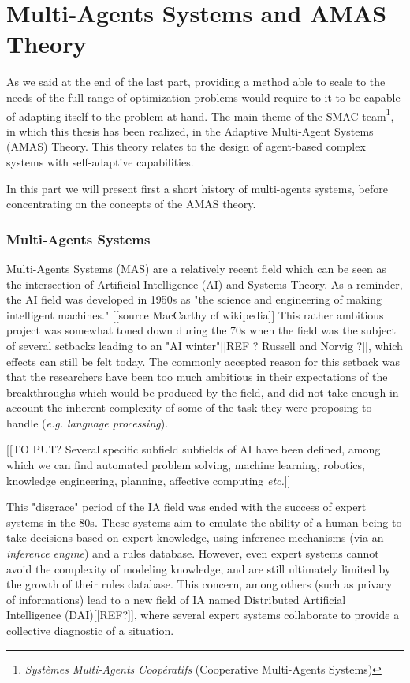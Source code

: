 \part{Multi-Agents Systems and AMAS Theory}

As we said at the end of the last part, providing a method able to scale to the needs of the full range of optimization problems would require to it to be capable of adapting itself to the problem at hand.
The main theme of the SMAC team\footnote{\emph{Systèmes Multi-Agents Coopératifs} (Cooperative Multi-Agents Systems)}, in which this thesis has been realized, in the Adaptive Multi-Agent Systems (AMAS) Theory. This theory relates to the design of agent-based complex systems with self-adaptive capabilities.

In this part we will present first a short history of multi-agents systems, before concentrating on the concepts of the AMAS theory.

\section{Multi-Agents Systems}

Multi-Agents Systems (MAS) are a relatively recent field which can be seen as the intersection of Artificial Intelligence (AI) and Systems Theory. As a reminder, the AI field was developed in 1950s as "the science and engineering of making intelligent machines." [[source MacCarthy cf wikipedia]] This rather ambitious project was somewhat toned down during the 70s when the field was the subject of several setbacks leading to an "AI winter"[[REF ? Russell and Norvig ?]], which effects can still be felt today. The commonly accepted reason for this setback was that the researchers have been too much ambitious in their expectations of the breakthroughs which would be produced by the field, and did not take enough in account the inherent complexity of some of the task they were proposing to handle (\emph{e.g. language processing}).

[[TO PUT? Several specific subfield subfields of AI have been defined, among which we can find automated problem solving, machine learning, robotics, knowledge engineering, planning, affective computing \emph{etc.}]]

This "disgrace" period of the IA field was ended with the success of expert systems in the 80s. These systems aim to emulate the ability of a human being to take decisions based on expert knowledge, using inference mechanisms (via an \emph{inference engine}) and a rules database.
However, even expert systems cannot avoid the complexity of modeling knowledge, and are still ultimately limited by the growth of their rules database. This concern, among others (such as privacy of informations) lead to a new field of IA named Distributed Artificial Intelligence (DAI)[[REF?]], where several expert systems collaborate to provide a collective diagnostic of a situation.

